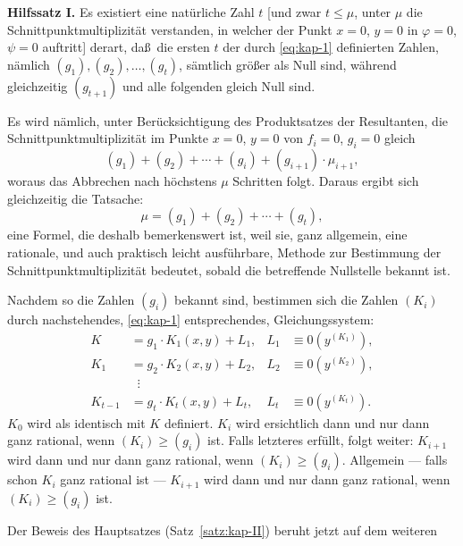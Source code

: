 \documentclass[12pt,a4paper]{article}
\theoremstyle{plain}
\theoremstyle{definition}
\theoremstyle{remark}
\begin{document}
\smallskip
\textbf{Hilfssatz I.} Es existiert eine nat\"urliche Zahl $t$ [und zwar
$t \leq \mu$, unter $\mu$ die Schnittpunktmultiplizit\"at verstanden, in
welcher der Punkt $x = 0$, $y = 0$ in $\varphi = 0$, $\psi = 0$
auftritt] derart, da\ss\ die ersten $t$ der durch \eqref{eq:kap-1}
definierten Zahlen, n\"amlich $(g_{1}), (g_{2}), \ldots, (g_{t})$, s\"amtlich
gr\"o\ss er als Null sind, w\"ahrend gleichzeitig $(g_{t+1})$ und alle
folgenden gleich Null sind.

Es wird n\"amlich, unter Ber\"ucksichtigung des Produktsatzes der
Resultanten, die Schnittpunktmultiplizit\"at im Punkte $x = 0$,
$y = 0$ von $f_{i} = 0$, $g_{i} = 0$ gleich
\[
(g_{1}) + (g_{2}) + \cdots + (g_{i}) + (g_{i+1}) \cdot \mu_{i+1},
\]
woraus das Abbrechen nach h\"ochstens $\mu$ Schritten folgt. Daraus
ergibt sich gleichzeitig die Tatsache:
\begin{equation}\label{eq:kap-2}
\mu = (g_{1}) + (g_{2}) + \cdots + (g_{t}),
\end{equation}
eine Formel, die deshalb bemerkenswert ist, weil sie, ganz allgemein,
eine rationale, und auch praktisch leicht ausf\"uhrbare, Methode zur
Bestimmung der Schnittpunktmultiplizit\"at bedeutet, sobald die
betreffende Nullstelle bekannt ist.

Nachdem so die Zahlen $(g_{i})$ bekannt sind, bestimmen sich die
Zahlen $(K_{i})$ durch nachstehendes, \eqref{eq:kap-1} entsprechendes,
Gleichungssystem:
\begin{equation}\label{eq:kap-3}
\begin{aligned}
K &= g_{1} \cdot K_{1}(x,y) + L_{1}, & L_{1} &\equiv 0(y^{(K_{1})}),\\
K_{1} &= g_{2} \cdot K_{2}(x,y) + L_{2}, & L_{2} &\equiv 0(y^{(K_{2})}),\\
&\;\;\vdots &&\\
K_{t-1} &= g_{t} \cdot K_{t}(x,y) + L_{t}, & L_{t} &\equiv 0(y^{(K_{t})}).
\end{aligned}
\end{equation}
$K_{0}$ wird als identisch mit $K$ definiert. $K_{i}$ wird ersichtlich
dann und nur dann ganz rational, wenn $(K_{i}) \geq (g_{i})$ ist. Falls
letzteres erf\"ullt, folgt weiter: $K_{i+1}$ wird dann und nur dann
ganz rational, wenn $(K_{i}) \geq (g_{i})$. Allgemein --- falls schon
$K_{i}$ ganz rational ist --- $K_{i+1}$ wird dann und nur dann ganz
rational, wenn $(K_{i}) \geq (g_{i})$ ist.

Der Beweis des Hauptsatzes (Satz~\ref{satz:kap-II}) beruht jetzt auf
dem weiteren
\end{document}
